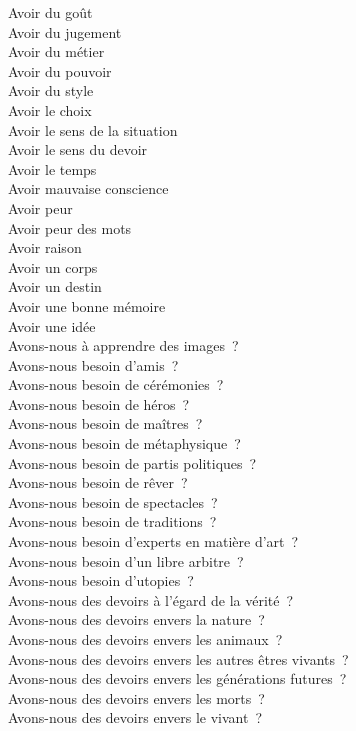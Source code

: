 \documentclass[a4paper,12pt]{article}
\begin{document}
Avoir du goût \\
Avoir du jugement \\
Avoir du métier \\
Avoir du pouvoir \\
Avoir du style \\
Avoir le choix \\
Avoir le sens de la situation \\
Avoir le sens du devoir \\
Avoir le temps \\
Avoir mauvaise conscience \\
Avoir peur \\
Avoir peur des mots \\
Avoir raison \\
Avoir un corps \\
Avoir un destin \\
Avoir une bonne mémoire \\
Avoir une idée \\
Avons-nous à apprendre des images ? \\
Avons-nous besoin d'amis ? \\
Avons-nous besoin de cérémonies ? \\
Avons-nous besoin de héros ? \\
Avons-nous besoin de maîtres ? \\
Avons-nous besoin de métaphysique ? \\
Avons-nous besoin de partis politiques ? \\
Avons-nous besoin de rêver ? \\
Avons-nous besoin de spectacles ? \\
Avons-nous besoin de traditions ? \\
Avons-nous besoin d'experts en matière d'art ? \\
Avons-nous besoin d'un libre arbitre ? \\
Avons-nous besoin d'utopies ? \\
Avons-nous des devoirs à l'égard de la vérité ? \\
Avons-nous des devoirs envers la nature ? \\
Avons-nous des devoirs envers les animaux ? \\
Avons-nous des devoirs envers les autres êtres vivants ? \\
Avons-nous des devoirs envers les générations futures ? \\
Avons-nous des devoirs envers les morts ? \\
Avons-nous des devoirs envers le vivant ? \\
\end{document}
